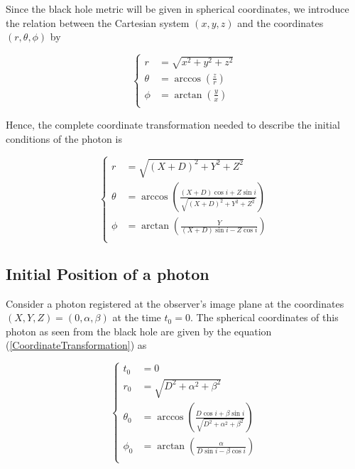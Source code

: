 Since the black hole metric will be given in spherical coordinates, we introduce the relation between the Cartesian system $(x,y,z)$ and the coordinates $(r,\theta, \phi)$ by

\begin{equation}
\begin{cases}
r &= \sqrt{x^2 + y^2 + z^2} \\
\theta &= \arccos \left( \frac{z}{r}\right)\\
\phi &= \arctan \left( \frac{y}{x} \right) \\
\end{cases}
\end{equation}

Hence, the complete coordinate transformation needed to describe the initial conditions of the photon is 

\begin{equation}
\begin{cases}
r &= \sqrt{(X+D)^2 + Y^2 + Z^2} \\
\theta &= \arccos \left( \frac{(X+D) \cos i + Z \sin i}{\sqrt{(X+D)^2 + Y^2 + Z^2}}\right)\\
\phi &= \arctan \left( \frac{Y}{(X+D)\sin i - Z \cos i} \right) \\
\end{cases} \label{CoordinateTransformation}
\end{equation}

\subsection{Initial Position of a photon}

Consider a photon registered at the observer's image plane at the coordinates $(X,Y,Z) = (0, \alpha, \beta)$ at the time $t_0 = 0$. The spherical coordinates of this photon as seen from the black hole are given by the equation (\ref{CoordinateTransformation}) as

\begin{equation}
\begin{cases}
t_0 &= 0\\
r_0 &= \sqrt{D^2 + \alpha^2 + \beta^2} \\
\theta_0 &= \arccos \left( \frac{D \cos i + \beta \sin i}{\sqrt{D^2 + \alpha^2 + \beta^2}}\right)\\
\phi_0 &= \arctan \left( \frac{\alpha}{D\sin i - \beta \cos i} \right) \\
\end{cases} 
\end{equation}

